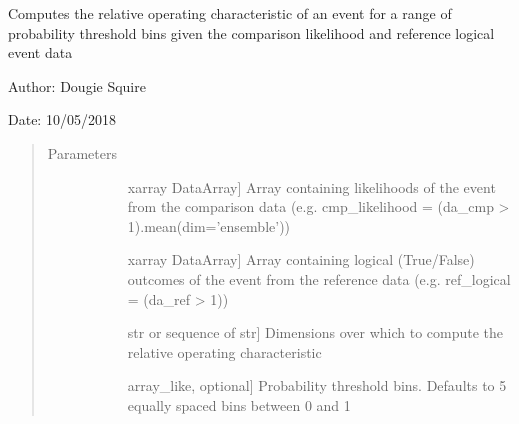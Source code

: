 \documentclass[letterpaper,10pt,english]{sphinxmanual}
\begin{document}
\begin{fulllineitems}
\end{fulllineitems}


\begin{fulllineitems}
\label{\detokenize{skill_doc:skill.roc}}
Computes the relative operating characteristic of an event for a range of probability                 threshold bins given the comparison likelihood and reference logical event data

\begin{DUlineblock}{0em}
\item[] Author: Dougie Squire
\item[] Date: 10/05/2018
\end{DUlineblock}
\begin{quote}\begin{description}
\item[{Parameters}] \leavevmode\begin{description}
\item[{}] \leavevmode{[}xarray DataArray{]}
Array containing likelihoods of the event from the comparison data (e.g. cmp\_likelihood =                     (da\_cmp \textgreater{} 1).mean(dim=’ensemble’))

\item[{}] \leavevmode{[}xarray DataArray{]}
Array containing logical (True/False) outcomes of the event from the reference data (e.g.                    ref\_logical = (da\_ref \textgreater{} 1))

\item[{}] \leavevmode{[}str or sequence of str{]}
Dimensions over which to compute the relative operating characteristic

\item[{}] \leavevmode{[}array\_like, optional{]}
Probability threshold bins. Defaults to 5 equally spaced bins between 0 and 1

\end{description}


\end{description}
\end{quote}
\end{fulllineitems}
\end{document}
